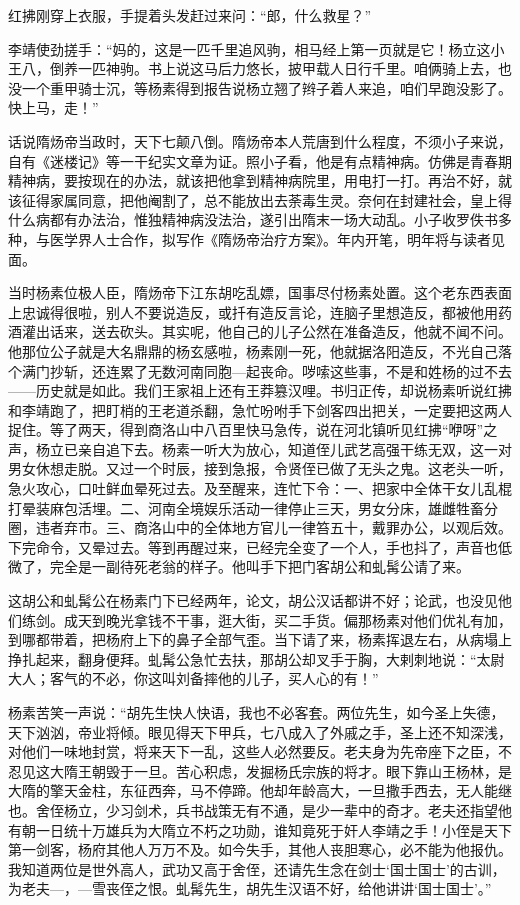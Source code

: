 红拂刚穿上衣服，手提着头发赶过来问：“郎，什么救星？”

李靖使劲搓手：“妈的，这是一匹千里追风驹，相马经上第一页就是它！杨立这小王八，倒养一匹神驹。书上说这马后力悠长，披甲载人日行千里。咱俩骑上去，也没一个重甲骑士沉，等杨素得到报告说杨立翘了辫子着人来追，咱们早跑没影了。快上马，走！”

话说隋炀帝当政时，天下七颠八倒。隋炀帝本人荒唐到什么程度，不须小子来说，自有《迷楼记》等一干纪实文章为证。照小子看，他是有点精神病。仿佛是青春期精神病，要按现在的办法，就该把他拿到精神病院里，用电打一打。再治不好，就该征得家属同意，把他阉割了，总不能放出去荼毒生灵。奈何在封建社会，皇上得什么病都有办法治，惟独精神病没法治，遂引出隋末一场大动乱。小子收罗佚书多种，与医学界人士合作，拟写作《隋炀帝治疗方案》。年内开笔，明年将与读者见面。

当时杨素位极人臣，隋炀帝下江东胡吃乱嫖，国事尽付杨素处置。这个老东西表面上忠诚得很啦，别人不要说造反，或扦有造反言论，连脑子里想造反，都被他用药酒灌出话来，送去砍头。其实呢，他自己的儿子公然在准备造反，他就不闻不问。他那位公子就是大名鼎鼎的杨玄感啦，杨素刚一死，他就据洛阳造反，不光自己落个满门抄斩，还连累了无数河南同胞—起丧命。哕嗦这些事，不是和姓杨的过不去——历史就是如此。我们王家祖上还有王莽篡汉哩。书归正传，却说杨素听说红拂和李靖跑了，把盯梢的王老道杀翻，急忙吩咐手下剑客四出把关，一定要把这两人捉住。等了两天，得到商洛山中八百里快马急传，说在河北镇听见红拂“咿呀”之声，杨立已亲自追下去。杨素一听大为放心，知道侄儿武艺高强干练无双，这一对男女休想走脱。又过一个时辰，接到急报，令贤侄已做了无头之鬼。这老头一听，急火攻心，口吐鲜血晕死过去。及至醒来，连忙下令：一、把家中全体干女儿乱棍打晕装麻包活埋。二、河南全境娱乐活动一律停止三天，男女分床，雄雌牲畜分圈，违者弃市。三、商洛山中的全体地方官儿一律笞五十，戴罪办公，以观后效。下完命令，又晕过去。等到再醒过来，已经完全变了一个人，手也抖了，声音也低微了，完全是一副待死老翁的样子。他叫手下把门客胡公和虬髯公请了来。

这胡公和虬髯公在杨素门下已经两年，论文，胡公汉话都讲不好；论武，也没见他们练剑。成天到晚光拿钱不干事，逛大街，买二手货。偏那杨素对他们优礼有加，到哪都带着，把杨府上下的鼻子全部气歪。当下请了来，杨素挥退左右，从病塌上挣扎起来，翻身便拜。虬髯公急忙去扶，那胡公却叉手于胸，大剌刺地说：“太尉大人；客气的不必，你这叫刘备摔他的儿子，买人心的有！”

杨素苦笑一声说：“胡先生快人快语，我也不必客套。两位先生，如今圣上失德，天下汹汹，帝业将倾。眼见得天下甲兵，七八成入了外戚之手，圣上还不知深浅，对他们一味地封赏，将来天下一乱，这些人必然要反。老夫身为先帝座下之臣，不忍见这大隋王朝毁于一旦。苦心积虑，发掘杨氏宗族的将才。眼下靠山王杨林，是大隋的擎天金柱，东征西奔，马不停蹄。他却年龄高大，一旦撒手西去，无人能继也。舍侄杨立，少习剑术，兵书战策无有不通，是少一辈中的奇才。老夫还指望他有朝一日统十万雄兵为大隋立不朽之功勋，谁知竟死于奸人李靖之手！小侄是天下第一剑客，杨府其他人万万不及。如今失手，其他人丧胆寒心，必不能为他报仇。我知道两位是世外高人，武功又高于舍侄，还请先生念在剑士‘国士国士’的古训，为老夫—，—雪丧侄之恨。虬髯先生，胡先生汉语不好，给他讲讲‘国士国士’。”

